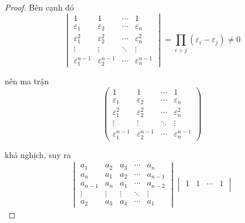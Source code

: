 \documentclass[class=linearalgebra,crop=false]{standalone}
\begin{document}
\begin{proof}
    \par Bên cạnh đó
    \[
        \begin{vmatrix}
            1                     & 1                     & \cdots & 1                     \\
            \varepsilon_{1}       & \varepsilon_{2}       & \cdots & \varepsilon_{n}       \\
            \varepsilon_{1}^{2}   & \varepsilon_{2}^{2}   & \cdots & \varepsilon_{n}^{2}   \\
            \vdots                & \vdots                & \ddots & \vdots                \\
            \varepsilon_{1}^{n-1} & \varepsilon_{2}^{n-1} & \cdots & \varepsilon_{n}^{n-1}
        \end{vmatrix}
        = \prod_{i>j}(\varepsilon_{i} - \varepsilon_{j}) \ne 0
    \]
    \par nên ma trận
    \[
        \begin{pmatrix}
            1                     & 1                     & \cdots & 1                     \\
            \varepsilon_{1}       & \varepsilon_{2}       & \cdots & \varepsilon_{n}       \\
            \varepsilon_{1}^{2}   & \varepsilon_{2}^{2}   & \cdots & \varepsilon_{n}^{2}   \\
            \vdots                & \vdots                & \ddots & \vdots                \\
            \varepsilon_{1}^{n-1} & \varepsilon_{2}^{n-1} & \cdots & \varepsilon_{n}^{n-1}
        \end{pmatrix}
    \]
    \par khả nghịch, suy ra
    \begin{align*}
        \begin{vmatrix}
            a_{1}   & a_{2}  & a_{3}  & \cdots & a_{n}   \\
            a_{n}   & a_{1}  & a_{2}  & \cdots & a_{n-1} \\
            a_{n-1} & a_{n}  & a_{1}  & \cdots & a_{n-2} \\
            \vdots  & \vdots & \vdots & \ddots & \vdots  \\
            a_{2}   & a_{3}  & a_{4}  & \cdots & a_{1}
        \end{vmatrix}
        \begin{vmatrix}
            1                     & 1                     & \cdots & 1                     \\

\end{vmatrix}
\end{align*}
\end{proof}
\end{document}

